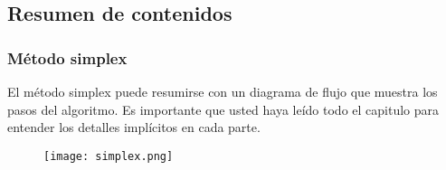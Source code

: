 \subsection{Resumen de contenidos}

\subsubsection{Método simplex}

El método simplex puede resumirse con un diagrama de flujo que muestra los pasos del algoritmo. Es importante que usted haya leído todo el capitulo para entender los detalles implícitos en cada parte.

\begin{figure}[ht]
  \centering
  \texttt{[image: simplex.png]}
\end{figure}




